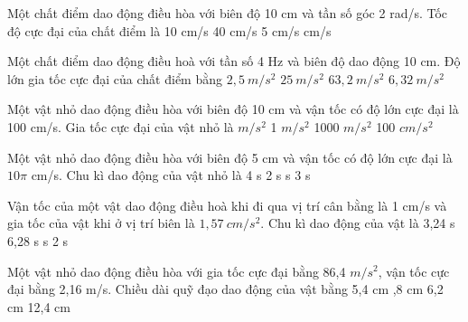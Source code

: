 \setcounter{ex}{0}
\setcounter{paragraph}{0}
\PhanI
\begin{ex}%
Một chất điểm dao động điều hòa với biên độ 10 cm và tần số góc 2 rad/s. Tốc độ cực đại của chất điểm là
\choice
{10 cm/s}
{40 cm/s}
{5 cm/s}
{ cm/s}
\end{ex} 
\begin{ex}
Một chất điểm dao động điều hoà với tần số 4 Hz và biên độ dao động 10 cm. Độ lớn gia tốc cực đại của chất điểm bằng
\choice
{$2,5\ m/s^2$}
{$25\ m/s^2$}
{\True $63,2\ m/s^2$}
{$6,32\ m/s^2$}
\end{ex} 
\begin{ex}%
Một vật nhỏ dao động điều hòa với biên độ 10 cm và vận tốc có độ lớn cực đại là 100 cm/s. Gia tốc cực đại của vật nhỏ là
\choice
{ $m/s^2$}
{1 $m/s^2$}
{1000 $m/s^2$}
{100 $ cm/s^2$}
\end{ex} 
\begin{ex}%
Một vật nhỏ dao động điều hòa với biên độ 5 cm và vận tốc có độ lớn cực đại là $10\pi$  cm/s. Chu kì dao động của vật nhỏ là
\choice
{4 s}
{2 s}
{ s}
{3 s}
\end{ex} 
\begin{ex}
Vận tốc của một vật dao động điều hoà khi đi qua vị trí cân bằng là 1 cm/s và gia tốc của vật khi ở vị trí biên là $1,57\ cm/s^2$. Chu kì dao động của vật là
\choice
{3,24 s}
{6,28 s}
{ s}
{2 s}
\end{ex} 
\begin{ex}%
Một vật nhỏ dao động điều hòa với gia tốc cực đại bằng 86,4 $m/s^2$, vận tốc cực đại bằng 2,16 m/s. Chiều dài quỹ đạo dao động của vật bằng
\choice
{5,4 cm}
{,8 cm}
{6,2 cm}
{12,4 cm}

\end{ex} 
